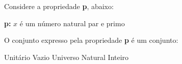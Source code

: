 \noindent\parbox{\linewidth}{

Considere a propriedade \textbf{p}, abaixo:
\begin{center}
	\textbf{p:} $x$ é um número natural par e primo
\end{center}
O conjunto expresso pela propriedade \textbf{p} é um conjunto:

Unitário
Vazio
Universo
Natural
Inteiro



}


